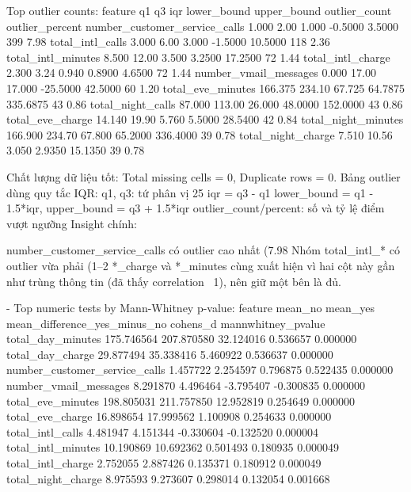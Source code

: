 Top outlier counts:
                      feature      q1     q3    iqr  lower_bound  upper_bound  outlier_count  outlier_percent
number_customer_service_calls   1.000   2.00  1.000      -0.5000       3.5000            399             7.98
             total_intl_calls   3.000   6.00  3.000      -1.5000      10.5000            118             2.36
           total_intl_minutes   8.500  12.00  3.500       3.2500      17.2500             72             1.44
            total_intl_charge   2.300   3.24  0.940       0.8900       4.6500             72             1.44
        number_vmail_messages   0.000  17.00 17.000     -25.5000      42.5000             60             1.20
            total_eve_minutes 166.375 234.10 67.725      64.7875     335.6875             43             0.86
            total_night_calls  87.000 113.00 26.000      48.0000     152.0000             43             0.86
             total_eve_charge  14.140  19.90  5.760       5.5000      28.5400             42             0.84
          total_night_minutes 166.900 234.70 67.800      65.2000     336.4000             39             0.78
           total_night_charge   7.510  10.56  3.050       2.9350      15.1350             39             0.78

           Chất lượng dữ liệu tốt: Total missing cells = 0, Duplicate rows = 0.
Bảng outlier dùng quy tắc IQR:
q1, q3: tứ phân vị 25%
iqr = q3 - q1
lower_bound = q1 - 1.5*iqr, upper_bound = q3 + 1.5*iqr
outlier_count/percent: số và tỷ lệ điểm vượt ngưỡng
Insight chính:

number_customer_service_calls có outlier cao nhất (7.98%
Nhóm total_intl_* có outlier vừa phải (1–2%
*_charge và *_minutes cùng xuất hiện vì hai cột này gần như trùng thông tin (đã thấy correlation ~1), nên giữ một bên là đủ.


- Top numeric tests by Mann-Whitney p-value:
                      feature    mean_no   mean_yes  mean_difference_yes_minus_no  cohens_d  mannwhitney_pvalue
            total_day_minutes 175.746564 207.870580                     32.124016  0.536657            0.000000
             total_day_charge  29.877494  35.338416                      5.460922  0.536637            0.000000
number_customer_service_calls   1.457722   2.254597                      0.796875  0.522435            0.000000
        number_vmail_messages   8.291870   4.496464                     -3.795407 -0.300835            0.000000
            total_eve_minutes 198.805031 211.757850                     12.952819  0.254649            0.000000
             total_eve_charge  16.898654  17.999562                      1.100908  0.254633            0.000000
             total_intl_calls   4.481947   4.151344                     -0.330604 -0.132520            0.000004
           total_intl_minutes  10.190869  10.692362                      0.501493  0.180935            0.000049
            total_intl_charge   2.752055   2.887426                      0.135371  0.180912            0.000049
           total_night_charge   8.975593   9.273607                      0.298014  0.132054            0.001668

